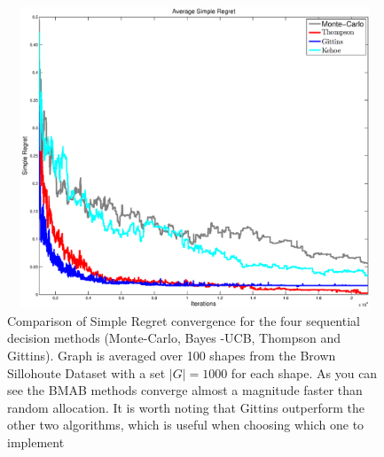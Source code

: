 \documentclass[journal,transmag]{IEEEtran}%
\begin{document}
\begin{figure}[ht!]
\centering
\includegraphics[width = 16.5cm, height = 9cm]{matlab_figures/simp_regret.eps}
\caption{ \footnotesize Comparison of Simple Regret convergence for the four sequential decision methods (Monte-Carlo, Bayes -UCB, Thompson and Gittins). Graph is averaged over 100 shapes from the Brown Sillohoute Dataset \cite{brown} with a set $|G|=1000$ for each shape. As you can see the BMAB methods converge almost a magnitude faster than random allocation. It is worth noting that Gittins outperform the other two algorithms, which is useful when choosing which one to implement }
\vspace*{-10pt}
\label{fig:simple_regret}
\end{figure}
\end{document}
